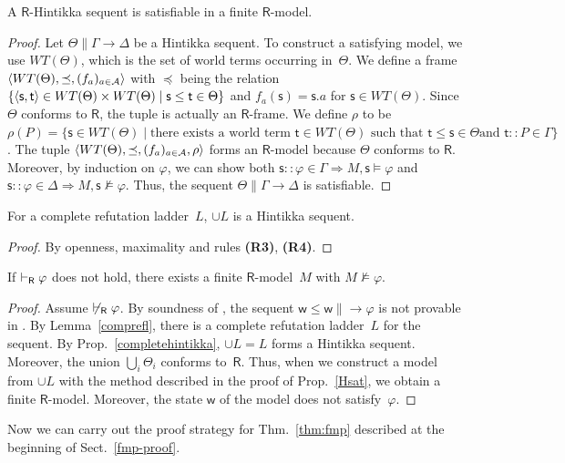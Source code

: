 \begin{proposition}
 \label{Hsat}
 A $\mathsf R$-Hintikka sequent is satisfiable in a finite $\mathsf R$-model.
\end{proposition}
\begin{proof}
 \newcommand{\W}{WT(\Theta)}
 Let $\Theta\parallel \Gamma\longrightarrow\Delta$ be a Hintikka sequent.
 To construct a satisfying model, we use $\W$,
 which is the set of world
 terms occurring in~$\Theta$.
 We define a frame $\tuple{\W, \preceq, (f_a)_{a\in\agents}}$ with
 $\preceq$ being the relation $\{\tuple{\mathsf s,\mathsf t}\in
 \W\times \W\mid
 \mathsf s\le
 \mathsf t\in\Theta\}$ and
 $f_a(\mathsf s) = \mathsf s.a$ for $\mathsf s\in\W$\enspace.
 Since $\Theta$ conforms to $\mathsf R$, 
 the tuple is actually an $\mathsf R$-frame.
 We define $\rho$ to be $\rho(P) = 
 \{\mathsf s\in \W\mid
 \mbox{there exists a world term } \mathsf t \in \W \mbox{ such that }
 \mathsf t\le
 \mathsf s \in \Theta\mbox{
 and }\mathsf t::P\in \Gamma\}$.
 The tuple $\tuple{\W,\preceq,(f_a)_{a\in \agents},\rho}$ forms
 an $\mathsf R$-model because $\Theta$ conforms to $\mathsf R$.
 Moreover, by induction on $\varphi$, we can show both 
 $\mathsf s::\varphi\in\Gamma\Longrightarrow M,\mathsf s\models\varphi$
 and 
 $\mathsf s::\varphi\in\Delta\Longrightarrow M,\mathsf s\not\models\varphi$.
 Thus, the sequent $\Theta\parallel \Gamma\longrightarrow\Delta$ is satisfiable.
\end{proof}

\begin{proposition}
\label{completehintikka}
 For a complete refutation ladder~$L$,
$\cup L$ is a Hintikka sequent.
\end{proposition}
\begin{proof}
 By openness, maximality and rules \textbf{(R3)}, \textbf{(R4)}.
\end{proof}

\begin{lemma}
\label{R-fmp}
 If $\vdash_{\mathsf R}\varphi$  does not hold, there exists a finite $\mathsf
 R$-model~$M$ with $M\not\models\varphi$.
\end{lemma}
\begin{proof}
 Assume $\not\vdash_{\mathsf R}\varphi$.
 By soundness of \LB,
 the sequent $\mathsf w\le\mathsf w\parallel \longrightarrow\varphi$ is not
 provable in \LB.
 By Lemma~\ref{comprefl},
 there is a complete refutation ladder~$L$ for the sequent.
 By Prop.~\ref{completehintikka},
 $\cup L = L$  forms a Hintikka
 sequent.
 Moreover, 
 the union $\bigcup_i\Theta_i$ conforms to~$\mathsf
 R$.
 Thus, when we construct a model from $\cup L$ with the method described in
 the proof of Prop.~\ref{Hsat},
 we obtain a finite $\mathsf R$-model.
 Moreover, the state $\mathsf w$ of the model does not satisfy~$\varphi$.
\end{proof}
Now we can carry out the proof strategy for Thm.~\ref{thm:fmp} described
at the beginning of Sect.~\ref{fmp-proof}.

